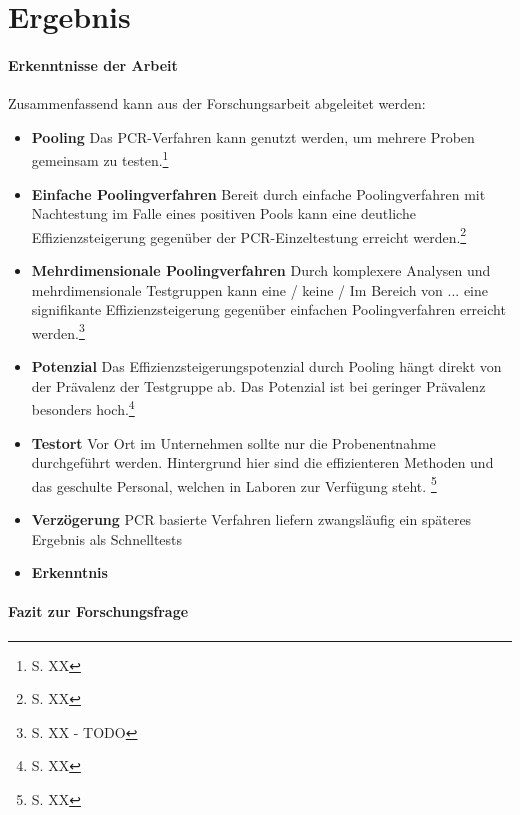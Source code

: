 \chapter{Ergebnis}
\subsubsection{Erkenntnisse der Arbeit}
Zusammenfassend kann aus der Forschungsarbeit abgeleitet werden:

\begin{itemize}
	\item \textbf{Pooling} Das PCR-Verfahren kann genutzt werden, um mehrere Proben gemeinsam zu testen.\footnote{S. XX}
	\item \textbf{Einfache Poolingverfahren} Bereit durch einfache Poolingverfahren mit Nachtestung im Falle eines positiven Pools kann eine deutliche Effizienzsteigerung gegenüber der PCR-Einzeltestung erreicht werden.\footnote{S. XX}
	\item \textbf{Mehrdimensionale Poolingverfahren} Durch komplexere Analysen und mehrdimensionale Testgruppen kann eine / keine / Im Bereich von ... eine signifikante Effizienzsteigerung gegenüber einfachen Poolingverfahren erreicht werden.\footnote{S. XX - TODO}
	\item \textbf{Potenzial} Das Effizienzsteigerungspotenzial durch Pooling hängt direkt von der Prävalenz der Testgruppe ab. Das Potenzial ist bei geringer Prävalenz besonders hoch.\footnote{S. XX}
	\item \textbf{Testort} Vor Ort im Unternehmen sollte nur die Probenentnahme durchgeführt werden. Hintergrund hier sind die effizienteren Methoden und das geschulte Personal, welchen in Laboren zur Verfügung steht. \footnote{S. XX}
	\item \textbf{Verzögerung} PCR basierte Verfahren liefern zwangsläufig ein späteres Ergebnis als Schnelltests
	\item \textbf{Erkenntnis} 
	
\end{itemize}

\cleardoublepage
\subsubsection{Fazit zur Forschungsfrage}



